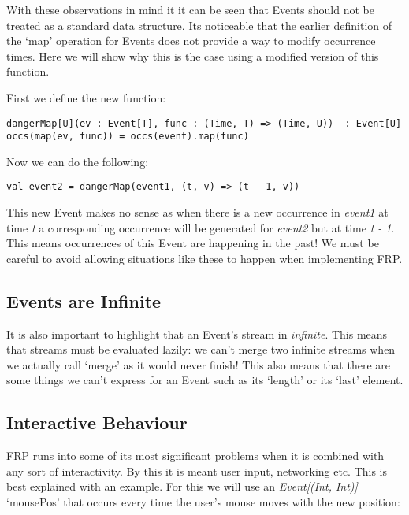 \documentclass[12pt]{article}
\begin{document}
      With these observations in mind it it can be seen that Events should not be treated as a
      standard data structure. Its noticeable that the earlier definition of the `map' operation for
      Events does not provide a way to modify occurrence times. Here we will show why this is
      the case using a modified version of this function.
      
      First we define the new function:
      
\begin{verbatim}
dangerMap[U](ev : Event[T], func : (Time, T) => (Time, U))  : Event[U]
occs(map(ev, func)) = occs(event).map(func)
\end{verbatim}

      Now we can do the following:
      
\begin{verbatim}
val event2 = dangerMap(event1, (t, v) => (t - 1, v))
\end{verbatim}

      This new Event makes no sense as when there is a new occurrence in \emph{event1} at time 
      \emph{t} a corresponding occurrence will be generated for \emph{event2} but at time 
      \emph{t - 1}. This means occurrences of this Event are happening in the past! We must
      be careful to avoid allowing situations like these to happen when implementing FRP.
      
    \subsection{Events are Infinite}  
      It is also important to highlight that an Event's stream in \emph{infinite}. This means
      that streams must be evaluated lazily: we can't merge two infinite streams when we actually
      call `merge' as it would never finish! This also means that there are some things we
      can't express for an Event such as its `length' or its `last' element.
    
      
    \subsection{Interactive Behaviour}
      FRP runs into some of its most significant problems when it is combined with any
      sort of interactivity. By this it is meant user input, networking etc. This is
      best explained with an example. For this we will use an \emph{Event[(Int, Int)]} `mousePos'
      that occurs every time the user's mouse moves with the new position:
\end{document}
